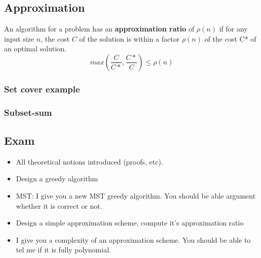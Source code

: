 \subsection{Approximation}

An algorithm for a problem has an \textbf{approximation ratio} of $\rho(n)$ if
for any input size $n$, the cost $C$ of the solution is within a factor
$\rho(n)$ of the cost C* of an optimal solution.
$$max(\frac{C}{C*}, \frac{C*}{C}) \leq \rho(n)$$

\subsubsection{Set cover example}


\subsubsection{Subset-sum}

\subsection{Exam}
\begin{itemize}
    \item All theoretical notions introduced (proofs, etc).
    \item Design a greedy algorithm
    \item MST: I give you a new MST greedy algorithm. You
        should be able argument whether it is correct or not.
    \item Design a simple approximation scheme, compute it’s
        approximation ratio
    \item I give you a complexity of an approximation scheme.
        You should be able to tel me if it is fully polynomial.
\end{itemize}
